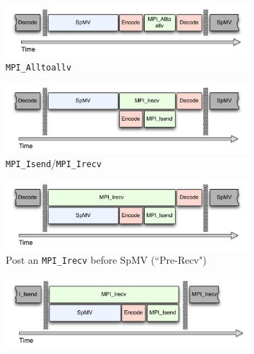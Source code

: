\documentclass{report}
\begin{document}
\begin{figure} 
\centering
\begin{subfigure}{0.48\textwidth}
\centering
\includegraphics[width=\textwidth]{../figures/omnigraffle/AlltoallvCPU.pdf}
\caption{\texttt{MPI\_Alltoallv}}
\label{fig:alltoallv_cpu}
\end{subfigure}
\begin{subfigure}{0.48\textwidth}
\centering
\includegraphics[width=\textwidth]{../figures/omnigraffle/IsendIrecvCPU.pdf}
\caption{\texttt{MPI\_Isend}/\texttt{MPI\_Irecv}}
\label{fig:isendirecv_cpu}
\end{subfigure}
\begin{subfigure}{0.48\textwidth}
\centering
\includegraphics[width=\textwidth]{../figures/omnigraffle/IsendPreIrecvCPU.pdf}
\caption{Post an \texttt{MPI\_Irecv} before SpMV (``Pre-Recv")}
\label{fig:preirecv_cpu}
\end{subfigure}
\begin{subfigure}{0.48\textwidth}
\centering
\includegraphics[width=\textwidth]{../figures/omnigraffle/NoDecode.pdf}

\end{subfigure}
\end{figure}
\end{document}
